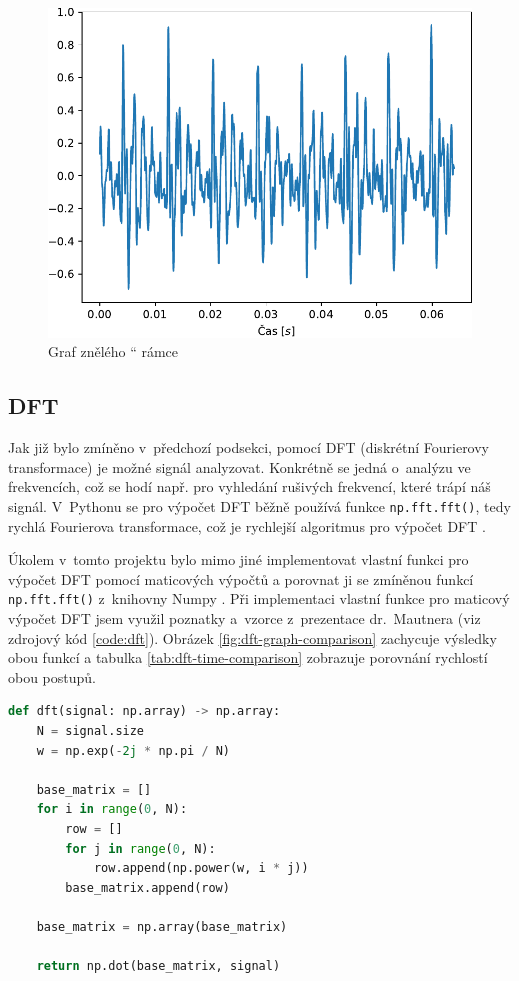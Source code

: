 \documentclass[a4paper, 11pt, final]{article}
\providecommand{\uv}[1]{\quotedblbase #1 \textquotedblleft}
\begin{document}
\begin{figure}[ht]
    \centering
    \includegraphics{img/02-nice-frame.pdf}
    \caption{Graf \uv{znělého} rámce}
    \label{fig:nice-frame}
\end{figure}

\subsection{DFT}

Jak již bylo zmíněno v~předchozí podsekci, pomocí DFT (diskrétní Fourierovy transformace) je možné signál analyzovat. Konkrétně se jedná o~analýzu ve frekvencích, což se hodí např. pro vyhledání rušivých frekvencí, které trápí náš signál. V~Pythonu se pro výpočet DFT běžně používá funkce \texttt{np.fft.fft()}, tedy rychlá Fourierova transformace, což je rychlejší algoritmus pro výpočet DFT \cite{zmolikova-demo}.

Úkolem v~tomto projektu bylo mimo jiné implementovat vlastní funkci pro výpočet DFT pomocí maticových výpočtů a porovnat ji se zmíněnou funkcí \texttt{np.fft.fft()} z~knihovny Numpy \cite{numpy-reference}. Při implementaci vlastní funkce pro maticový výpočet DFT jsem využil poznatky a~vzorce z~prezentace dr.~Mautnera \cite{dft-matrix} (viz zdrojový kód \ref{code:dft}). Obrázek \ref{fig:dft-graph-comparison} zachycuje výsledky obou funkcí a tabulka \ref{tab:dft-time-comparison} zobrazuje porovnání rychlostí obou postupů.

\begin{lstlisting}[language=Python, caption=Vlastní funkce pro výpočet DFT, label={code:dft}]
def dft(signal: np.array) -> np.array:
    N = signal.size
    w = np.exp(-2j * np.pi / N)

    base_matrix = []
    for i in range(0, N):
        row = []
        for j in range(0, N):
            row.append(np.power(w, i * j))
        base_matrix.append(row)

    base_matrix = np.array(base_matrix)

    return np.dot(base_matrix, signal)
\end{lstlisting}
\end{document}
